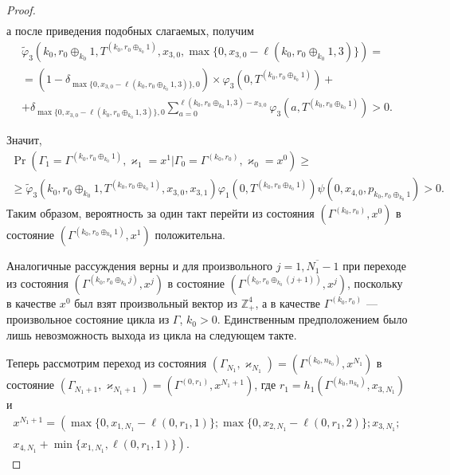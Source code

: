 \documentclass[a4paper,12pt,russian]{extarticle}
\begin{document}
\begin{proof}
\begin{multline*}
\end{multline*}
а после приведения подобных слагаемых, получим
\begin{multline*}
\widetilde{\varphi}_3(k_0,r_0\oplus_{k_0}1,T^{(k_0,r_0\oplus_{k_0}1)},x_{3,0},\max{\{0,x_{3,0} - \ell(k_0,r_0\oplus_{k_0}1,3)\}})=\\=(1-\delta_{\max{\{0,x_{3,0} - \ell(k_0,r_0\oplus_{k_0}1,3)\}},0}) \times \varphi_3(0,T^{(k_0,r_0\oplus_{k_0}1)} ) +\\
+\delta_{\max{\{0,x_{3,0} - \ell(k_0,r_0\oplus_{k_0}1,3)\}},0} \sum_{a=0}^{\ell(k_0,r_0\oplus_{k_0}1,3)-x_{3,0}}\varphi_3 (a,T^{(k_0,r_0\oplus_{k_0}1)})>0.
\end{multline*}

Значит,
\begin{multline*}
\Pr (\Gamma_{1}=\Gamma^{(k_0,r_0\oplus_{k_0}1)},\varkappa_{1}=x^1 | \Gamma_{0}=\Gamma^{(k_0,r_0)},\varkappa_0=x^0)\geqslant \\
\geqslant \widetilde{\varphi}_3(k_0,r_0\oplus_{k_0}1,T^{(k_0,r_0\oplus_{k_0}1)},x_{3,0},x_{3,1})
\varphi_1(0,T^{(k_0,r_0\oplus_{k_0}1)})  \psi(0,x_{4,0}, p_{k_0,r_0\oplus_{k_0}1}) > 0.
\end{multline*}
Таким образом, вероятность за один такт перейти из состояния $(\Gamma^{(k_0,r_0)}, x^0)$ в состояние $ (\Gamma^{(k_0,r_0\oplus_{k_0}1)}, x^1)$ положительна.

Аналогичные рассуждения верны и для произвольного $j=\overline{1,N_1-1}$
при переходе из состояния $(\Gamma^{(k_0,r_0\oplus_{k_0} j)},x^j)$ в состояние $(\Gamma^{(k_0,r_0\oplus_{k_0}(j+1))},x^j)$, поскольку в качестве $x^0$ был взят произвольный вектор из $\mathbb{Z}_+^4$, а в качестве $\Gamma^{(k_0,r_0)}$ --- произвольное состояние цикла из $\Gamma$, $k_0>0$. Единственным предположением было лишь невозможность выхода из цикла на следующем такте.

Теперь рассмотрим переход из состояния $(\Gamma_{N_1},\varkappa_{N_1}) = (\Gamma^{(k_0,n_{k_0})},x^{N_1})$ в состояние $(\Gamma_{N_1+1},\varkappa_{N_1+1}) = (\Gamma^{(0,r_1)},x^{N_1+1})$, где $r_1 = h_1(\Gamma^{(k_0,n_{k_0})},x_{3,N_1})$ и 
\begin{multline*}
x^{N_1+1}=\left(\max{\{0,x_{1,N_1} - \ell(0,r_1,1)\}};
\max{\{0,x_{2,N_1} - \ell(0,r_1,2)\}};x_{3,N_1};\right.\\
\left.
x_{4,N_1} + \min{\{x_{1,N_1}, \ell(0,r_1,1)\}}\right).
\end{multline*}


\end{proof}
\end{document}
